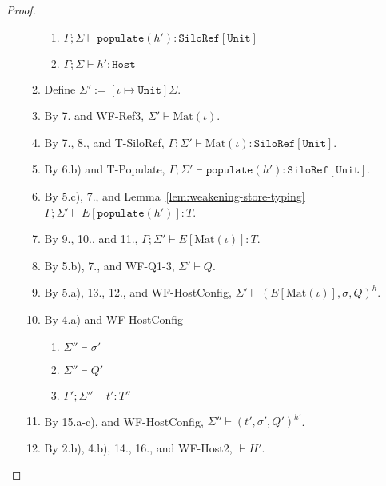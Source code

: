 \documentclass{article}
\theoremstyle{definition}
\begin{document}
\begin{proof}
\begin{itemize}
\begin{enumerate}
\begin{enumerate}[label=(\alph*)]
  \item $\Gamma ; \Sigma \vdash \texttt{populate}(h') : \texttt{SiloRef}[\texttt{Unit}]$
  \item $\Gamma ; \Sigma \vdash h' : \texttt{Host}$
  \end{enumerate}
\item Define $\Sigma' := [\iota \mapsto \texttt{Unit}]\Sigma$.
\item By 7. and WF-Ref3, $\Sigma' \vdash \text{Mat}(\iota)$.
\item By 7., 8., and T-SiloRef, $\Gamma ; \Sigma' \vdash \text{Mat}(\iota) : \texttt{SiloRef}[\texttt{Unit}]$.
\item By 6.b) and T-Populate, $\Gamma ; \Sigma' \vdash \texttt{populate}(h') : \texttt{SiloRef}[\texttt{Unit}]$.
\item By 5.c), 7., and Lemma~\ref{lem:weakening-store-typing}$\Gamma ; \Sigma' \vdash E[\texttt{populate}(h')] : T$.
\item By 9., 10., and 11., $\Gamma ; \Sigma' \vdash E[\text{Mat}(\iota)] : T$.
\item By 5.b), 7., and WF-Q1-3, $\Sigma' \vdash Q$.
\item By 5.a), 13., 12., and WF-HostConfig, $\Sigma' \vdash (E[\text{Mat}(\iota)], \sigma, Q)^h$.
\item By 4.a) and WF-HostConfig
  \begin{enumerate}[label=(\alph*)]
  \item $\Sigma'' \vdash \sigma'$
  \item $\Sigma'' \vdash Q'$
  \item $\Gamma' ; \Sigma'' \vdash t' : T''$
  \end{enumerate}
\item By 15.a-c), and WF-HostConfig, $\Sigma'' \vdash (t', \sigma', Q')^{h'}$.
\item By 2.b), 4.b), 14., 16., and WF-Host2, $\vdash H'$.
\end{enumerate}


\end{itemize}
\end{proof}
\end{document}
